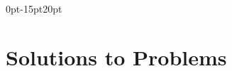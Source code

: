 \documentclass[letterpaper,11pt]{book}
\newif\ifshowbackmatter
\begin{document}




\begingroup{}
\renewcommand{\cleardoublepage}{}
\renewcommand{\clearpage}{}

\addnewlinetotoc{}

\newpage{}
\endgroup{}

\fi  %



\ifshowbackmatter


% 

\backmatter{}

\titleformat{\chapter}[display]
{\normalfont\huge\bfseries\sffamily}{}{25pt}{\chaptitlenonumber}
\titlespacing*{\chapter} {0pt}{-15pt}{20pt}


\addnewlinetotoc{}
\clearpage{}


\chapter[\bf Solutions to Problems]{Solutions to Problems}
\end{document}
